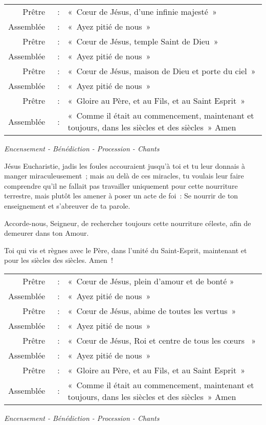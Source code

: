 

\begin{tabular}{rcp{10cm}}
Prêtre & : &		« Cœur de Jésus, d’une infinie majesté » \\
Assemblée & : &	« Ayez pitié de nous » \\
Prêtre & : &		« Cœur de Jésus, temple Saint de Dieu » \\
Assemblée & : &	« Ayez pitié de nous » \\
Prêtre & : &		« Cœur de Jésus, maison de Dieu et porte du ciel » \\
Assemblée & : &	« Ayez pitié de nous » \\
Prêtre & : &		« Gloire au Père, et au Fils, et au Saint Esprit » \\
Assemblée & : &	« Comme il était au commencement, maintenant et toujours, dans les siècles et des siècles » Amen  \\
\end{tabular}
\emph{Encensement - Bénédiction - Procession - Chants}



Jésus Eucharistie, jadis les foules accouraient jusqu’à toi et tu leur donnais à manger miraculeusement ; mais au delà de ces miracles, tu voulais leur faire comprendre qu’il ne fallait pas travailler uniquement pour cette nourriture terrestre, mais plutôt les amener à poser un acte de foi : Se nourrir de ton enseignement et s’abreuver de ta parole.

Accorde-nous, Seigneur, de rechercher toujours cette nourriture céleste, afin de demeurer dans ton Amour.

Toi qui vis et règnes avec le Père, dans l’unité du Saint-Esprit, maintenant et pour les siècles des siècles. Amen !



\begin{tabular}{rcp{10cm}}
Prêtre & : &		« Cœur de Jésus, plein d'amour et de bonté » \\
Assemblée & : &	« Ayez pitié de nous » \\
Prêtre & : &		« Cœur de Jésus, abime de toutes les vertus » \\
Assemblée & : &	« Ayez pitié de nous » \\
Prêtre & : &		« Cœur de Jésus, Roi et centre de tous les cœurs  » \\
Assemblée & : &	« Ayez pitié de nous » \\
Prêtre & : &		« Gloire au Père, et au Fils, et au Saint Esprit » \\
Assemblée & : &	« Comme il était au commencement, maintenant et toujours, dans les siècles et des siècles » Amen  \\
\end{tabular}

\emph{Encensement - Bénédiction - Procession - Chants}

